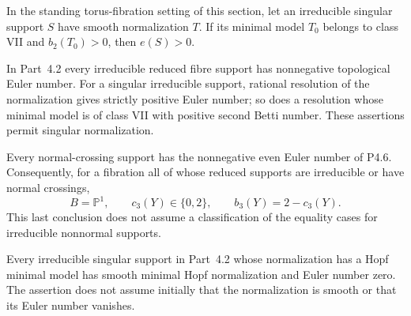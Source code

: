 
\begin{proposition}[P4.23]\hypertarget{tag-02WV}{}\label{night:P4.23}\label{stmt:P4.23}


In the standing torus-fibration setting of this section, let an irreducible singular support
$S$ have smooth normalization $T$. If its minimal model $T_0$
belongs to class VII and $b_2(T_0)>0$, then $e(S)>0$.
\end{proposition}

\begin{proposition}[P4.26]\hypertarget{tag-02WY}{}\label{night:P4.26}\label{stmt:P4.26}


In Part~4.2 every irreducible reduced fibre support
has nonnegative topological Euler number. For a
singular irreducible support, rational resolution
of the normalization gives strictly positive
Euler number; so does a resolution whose minimal
model is of class VII with positive second
Betti number. These assertions permit singular
normalization.

Every normal-crossing support has the
nonnegative even Euler number of P4.6.
Consequently, for a fibration all of whose
reduced supports are irreducible or have
normal crossings,
\[
 B=\mathbb P^1,\qquad c_3(Y)\in\{0,2\},
 \qquad b_3(Y)=2-c_3(Y).
\]
This last conclusion does not assume a
classification of the equality cases for
irreducible nonnormal supports.
\end{proposition}

\begin{proposition}[P4.36]\hypertarget{tag-02X9}{}\label{night:P4.36}\label{stmt:P4.36}


Every irreducible singular support in Part~4.2 whose
normalization has a Hopf minimal model has smooth minimal
Hopf normalization and Euler number zero. The assertion
does not assume initially that the normalization is smooth
or that its Euler number vanishes.
\end{proposition}


